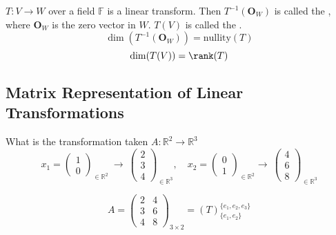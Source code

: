 \newpage

\begin{definition}
    $T: V \to W$ over a field $\mathbb{F}$ is a linear transform. Then $T^{-1}(\mathbf{O}_W)$ is called the , where $\mathbf{O}_W$ is the zero vector in $W$. $T(V)$ is called the .
    \[
        \dim(T^{-1}(\mathbf{O}_W)) = \text{nullity}(T)
    \]
    \[
        \dim(T(V)) = \rank(T)
    \]
\end{definition}

\subsection{Matrix Representation of Linear Transformations}

\begin{exercise}
    What is the transformation taken $A: \mathbb{R}^2 \to \mathbb{R}^3$
    \[
        x_1 = \begin{pmatrix}
            1 \\ 0
        \end{pmatrix}_{\in \mathbb{R}^2} \ \to \ \begin{pmatrix}
            2 \\ 3 \\ 4
        \end{pmatrix}_{\in \mathbb{R}^3}, \quad
        x_2 = \begin{pmatrix}
            0 \\ 1
        \end{pmatrix}_{\in \mathbb{R}^2} \to \ \begin{pmatrix}
            4 \\ 6 \\ 8
        \end{pmatrix}_{\in \mathbb{R}^3}
    \]
\end{exercise}
\begin{answer}
    \[
        A = \begin{pmatrix}
            2 & 4 \\
            3 & 6 \\
            4 & 8
        \end{pmatrix}_{3 \times 2} = \left( T \right)_{\{e_1, e_2\}}^{\{e_1, e_2, e_3\}}
    \]
\end{answer}

